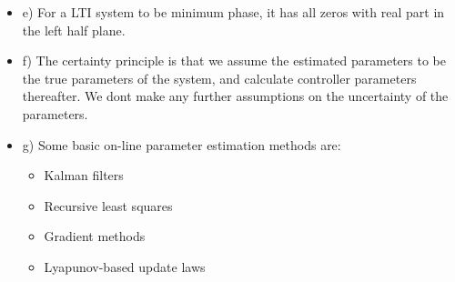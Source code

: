 \begin{itemize}
    \item e)
    For a LTI system to be minimum phase, it has all zeros with real part in the left half plane. 

    \item f)
    The certainty principle is that we assume the estimated parameters to be the true parameters of the system, and calculate controller parameters thereafter. 
    We dont make any further assumptions on the uncertainty of the parameters. 

    \item g) 
    Some basic on-line parameter estimation methods are: 
    \begin{itemize}
        \item Kalman filters
        \item Recursive least squares
        \item Gradient methods
        \item Lyapunov-based update laws
    \end{itemize}







\end{itemize}